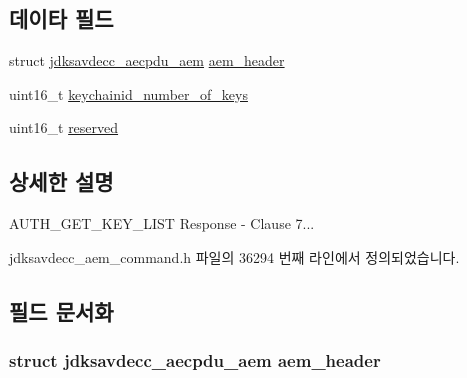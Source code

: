 \subsection*{데이타 필드}
\begin{DoxyCompactItemize}
\item 
struct \hyperlink{structjdksavdecc__aecpdu__aem}{jdksavdecc\+\_\+aecpdu\+\_\+aem} \hyperlink{structjdksavdecc__aem__command__auth__get__key__list__response_ae1e77ccb75ff5021ad923221eab38294}{aem\+\_\+header}
\item 
uint16\+\_\+t \hyperlink{structjdksavdecc__aem__command__auth__get__key__list__response_a857e21874a37fd25582ef7c6f08c41a8}{keychainid\+\_\+number\+\_\+of\+\_\+keys}
\item 
uint16\+\_\+t \hyperlink{structjdksavdecc__aem__command__auth__get__key__list__response_a5a6ed8c04a3db86066924b1a1bf4dad3}{reserved}
\end{DoxyCompactItemize}


\subsection{상세한 설명}
A\+U\+T\+H\+\_\+\+G\+E\+T\+\_\+\+K\+E\+Y\+\_\+\+L\+I\+ST Response -\/ Clause 7... 

jdksavdecc\+\_\+aem\+\_\+command.\+h 파일의 36294 번째 라인에서 정의되었습니다.



\subsection{필드 문서화}
\subsubsection[{\texorpdfstring{aem\+\_\+header}{aem_header}}]{\setlength{\rightskip}{0pt plus 5cm}struct {\bf jdksavdecc\+\_\+aecpdu\+\_\+aem} aem\+\_\+header}\hypertarget{structjdksavdecc__aem__command__auth__get__key__list__response_ae1e77ccb75ff5021ad923221eab38294}{}\label{structjdksavdecc__aem__command__auth__get__key__list__response_ae1e77ccb75ff5021ad923221eab38294}


